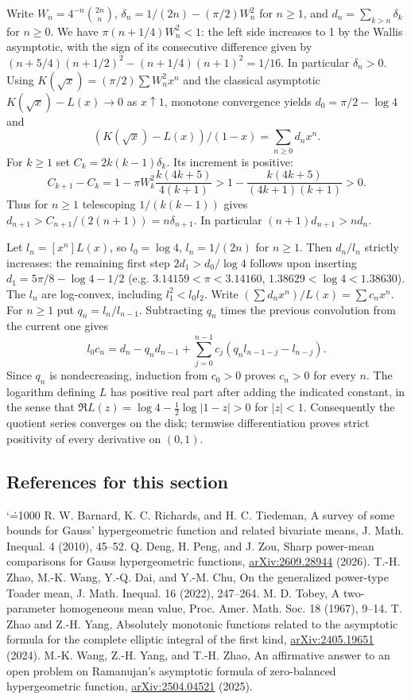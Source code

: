 \documentclass[11pt,a4paper]{article}
\makeatletter
\numberwithin{equation}{section}
\theoremstyle{definition}
\theoremstyle{remark}
\renewenvironment{thebibliography}[1]
 {\subsection*{References for this section}\small
  \list{\@biblabel{\@arabic\c@enumiv}}
       {\settowidth\labelwidth{\@biblabel{#1}}\leftmargin\labelwidth
        \advance\leftmargin\labelsep\@openbib@code
        \usecounter{enumiv}\let\p@enumiv\@empty
        \renewcommand\theenumiv{\@arabic\c@enumiv}}
  \sloppy\clubpenalty4000\widowpenalty4000\sfcode`\.=1000\relax}
 {\def\@noitemerr{\@latex@warning{Empty bibliography}}\endlist}
\makeatother
\begin{document}
Write $W_n=4^{-n}\binom{2n}{n}$,
$\delta_n=1/(2n)-(\pi/2)W_n^2$ for $n\ge1$, and
$d_n=\sum_{k>n}\delta_k$ for $n\ge0$.
We have $\pi(n+1/4)W_n^2<1$: the left side increases to 1 by the
Wallis asymptotic, with the sign of its consecutive difference given by
$(n+5/4)(n+1/2)^2-(n+1/4)(n+1)^2=1/16$.
In particular $\delta_n>0$. Using $K(\sqrt{x})=(\pi/2)\sum W_n^2 x^n$
and the classical asymptotic $K(\sqrt{x})-L(x)\to0$ as $x\uparrow1$, monotone convergence yields $d_0=\pi/2-\log 4$ and
\[
 (K(\sqrt{x})-L(x))/(1-x)=\sum_{n\ge0}d_nx^n .
\]
For $k\ge1$ set $C_k=2k(k-1)\delta_k$. Its increment is positive:
\[
 C_{k+1}-C_k
 =1-\pi W_k^2\frac{k(4k+5)}{4(k+1)}
 >1-\frac{k(4k+5)}{(4k+1)(k+1)}>0.
\]
Thus for $n\ge1$ telescoping $1/(k(k-1))$ gives
$d_{n+1}>C_{n+1}/(2(n+1))=n\delta_{n+1}$. In particular
$(n+1)d_{n+1}>nd_n$.

Let $l_n=[x^n]L(x)$, so $l_0=\log4$, $l_n=1/(2n)$ for $n\ge1$.
Then $d_n/l_n$ strictly increases: the remaining first step
$2d_1>d_0/\log4$ follows upon inserting $d_1=5\pi/8-\log4-1/2$
(e.g. $3.14159<\pi<3.14160$, $1.38629<\log4<1.38630$).
The $l_n$ are log-convex, including $l_1^2<l_0 l_2$.
Write $(\sum d_nx^n)/L(x)=\sum c_nx^n$. For $n\ge1$ put
$q_n=l_n/l_{n-1}$. Subtracting $q_n$ times the previous convolution
from the current one gives
\[
 l_0c_n=d_n-q_nd_{n-1}
 +\sum_{j=0}^{n-1}c_j(q_n l_{n-1-j}-l_{n-j}).
\]
Since $q_n$ is nondecreasing, induction from $c_0>0$ proves $c_n>0$
for every $n$. The logarithm defining $L$ has positive real part after adding the indicated constant, in the sense that $\Re L(z)=\log4-\tfrac12\log|1-z|>0$ for $|z|<1$.
Consequently the quotient series converges on the disk; termwise
differentiation proves strict positivity of every derivative on $(0,1)$.

\begin{thebibliography}{8}
 R. W. Barnard, K. C. Richards, and H. C. Tiedeman,
A survey of some bounds for Gauss' hypergeometric function and related bivariate means, J. Math. Inequal. 4 (2010), 45--52.
 Q. Deng, H. Peng, and J. Zou, Sharp power-mean comparisons for Gauss hypergeometric functions, \href{https://arxiv.org/abs/2609.28944}{arXiv:2609.28944} (2026).
 T.-H. Zhao, M.-K. Wang, Y.-Q. Dai, and Y.-M. Chu,
On the generalized power-type Toader mean, J. Math. Inequal. 16 (2022), 247--264.
 M. D. Tobey, A two-parameter homogeneous mean value, Proc. Amer. Math. Soc. 18 (1967), 9--14.
 T. Zhao and Z.-H. Yang, Absolutely monotonic functions related to the asymptotic formula for the complete elliptic integral of the first kind, \href{https://arxiv.org/abs/2405.19651}{arXiv:2405.19651} (2024).
 M.-K. Wang, Z.-H. Yang, and T.-H. Zhao, An affirmative answer to an open problem on Ramanujan's asymptotic formula of zero-balanced hypergeometric function, \href{https://arxiv.org/abs/2504.04521}{arXiv:2504.04521} (2025).
\end{thebibliography}
\end{document}
